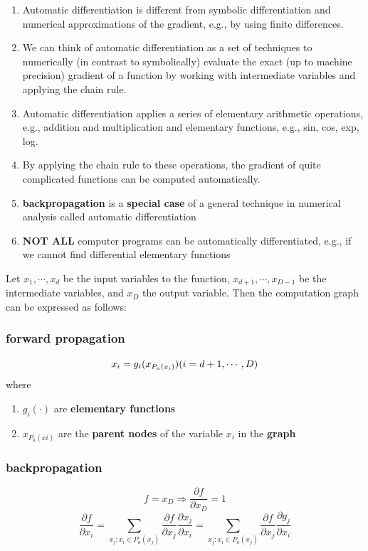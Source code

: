 \begin{enumerate}
    \item Automatic differentiation is different from symbolic differentiation and numerical approximations of the gradient, e.g., by using finite differences.

    \item We can think of automatic differentiation as a set of techniques to numerically (in contrast to symbolically) evaluate the exact (up to machine precision) gradient of a function by working with intermediate variables and applying the chain rule. 

    \item Automatic differentiation applies a series of elementary arithmetic operations, e.g., addition and multiplication and elementary functions, e.g., sin, cos, exp, log. 

    \item By applying the chain rule to these operations, the gradient of quite complicated functions can be computed automatically.

    \item \textbf{backpropagation} is a \textbf{special case} of a general technique in numerical analysis called automatic differentiation

    \item \textbf{NOT ALL} computer programs can be automatically differentiated, e.g., if we cannot find differential elementary functions
\end{enumerate}

Let $x_1, \cdots , x_d$ be the input variables to the function, $x_{d+1}, \cdots , x_{D-1}$ be the intermediate variables, and $x_D$ the output variable. Then the computation graph can be expressed as follows:


\subsubsection*{forward propagation}
\[
    x_i = g_i(x_{P_a(x_i)}) \hfill (i = d+1, \cdots, D)
\]
where
\begin{enumerate}
    \item $g_i(\cdot)$ are \textbf{elementary functions}

    \item $x_{P_a(xi)}$ are the \textbf{parent nodes} of the variable $x_i$ in the \textbf{graph}

\end{enumerate}

\subsubsection*{backpropagation}
\[
    f = x_D \Rightarrow \dfrac{\partial f}{\partial x_D} = 1
\]
\[
    \displaystyle 
    \dfrac{\partial f}{ \partial x_i} = 
    \sum_{x_j:x_i\in P_a(x_j)} \dfrac{\partial f}{\partial x_j} \dfrac{\partial x_j}{\partial x_i} =
    \sum_{x_j:x_i\in P_a(x_j)} \dfrac{\partial f}{\partial x_j} \dfrac{\partial g_j}{\partial x_i} 
\]

